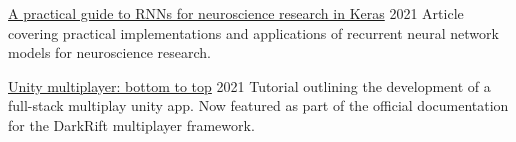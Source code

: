 

\begin{cventries}

  \cventry%
    {} %
    {\href{https://dev.to/robodoig/a-practical-guide-to-rnns-for-neuroscience-research-in-keras-1ad2}{A practical guide to RNNs for neuroscience research in Keras}} %
    {} %
    {2021} %
    {Article covering practical implementations and applications of recurrent neural network models for neuroscience research.}

  \cventry%
    {} %
    {\href{https://dev.to/robodoig/unity-multiplayer-bottom-to-top-46cj}{Unity multiplayer: bottom to top}} %
    {} %
    {2021} %
    {Tutorial outlining the development of a full-stack multiplay unity app. Now featured as part of the official documentation for the DarkRift multiplayer framework.}
\end{cventries}
